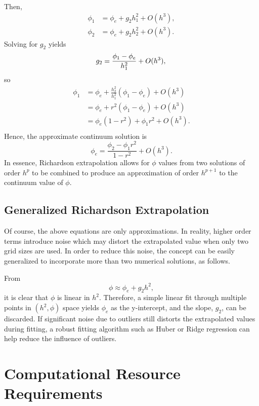 Then,
\begin{align*}
  \phi_1 &= \phi_e + g_2 h_1^2 + O(h^3), \\
  \phi_2 &= \phi_e + g_2 h_2^2 + O(h^3).
\end{align*}
Solving for $g_2$ yields
\begin{equation*}
  g_2 = \frac{\phi_1 - \phi_e}{h_1^2} + O(h^3), \\
\end{equation*}
so
\begin{align*}
  \phi_1 &= \phi_e + \frac{h_2^2}{h_1^2}(\phi_1 - \phi_e) + O(h^3) \\
  &=  \phi_e + r^2(\phi_1 - \phi_e) + O(h^3) \\
  &= \phi_e(1-r^2) + \phi_1 r^2 + O(h^3). \\
\end{align*}
Hence, the approximate continuum solution is
\begin{equation*}
  \phi_e = \frac{\phi_2 - \phi_1 r^2}{1 - r^2} + O(h^3).
\end{equation*}
In essence, Richardson extrapolation allows for $\phi$ values from two solutions of order $h^p$ to be combined to produce an approximation of order $h^{p+1}$ to the continuum value of $\phi$.

\subsection{Generalized Richardson Extrapolation}
Of course, the above equations are only approximations.
In reality, higher order terms introduce noise which may distort the extrapolated value
when only two grid sizes are used.
In order to reduce this noise, the concept can be easily generalized to incorporate more than two numerical solutions, as follows.

From
\begin{equation*}
  \phi \approx \phi_e + g_2 h^2,
\end{equation*}
it is clear that $\phi$ is linear in $h^2$.
Therefore, a simple linear fit through multiple points in $(h^2, \phi)$ space yields $\phi_e$ as the y-intercept, and the slope, $g_2$, can be discarded.
If significant noise due to outliers still distorts the extrapolated values during fitting, a robust fitting algorithm such as Huber \cite{yu_robust_2014} or Ridge \cite{hoerl_ridge_1970} regression can help reduce the influence of outliers.

\section{Computational Resource Requirements}
